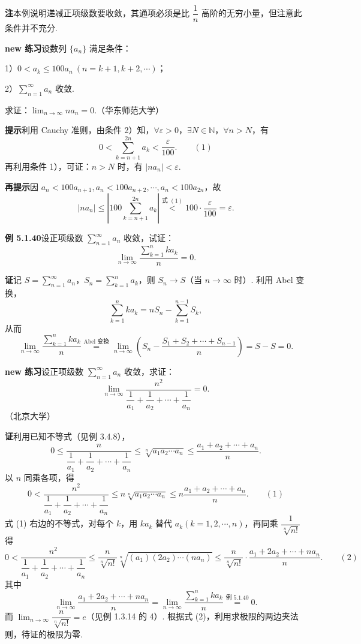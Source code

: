 \documentclass[UTF8,12pt,a4paper,fontset=fandol]{ctexart}
\begin{document}
\noindent\textbf{注}\quad 本例说明递减正项级数要收敛，其通项必须是比 $\dfrac1n$ 高阶的无穷小量，但注意此条件并不充分.

\noindent\textbf{new 练习}\quad 设数列 $\{a_n\}$ 满足条件：

1）$0<a_k\le100a_n\ (n=k+1,k+2,\cdots)$；

2）$\displaystyle\sum_{n=1}^{\infty}a_n$ 收敛.

求证：$\displaystyle\lim_{n\to\infty}na_n=0$.（华东师范大学）

\noindent\textbf{提示}\quad 利用 Cauchy 准则，由条件 2）知，$\forall\varepsilon>0$，$\exists N\in\mathbb N$，$\forall n>N$，有
\[
  0<\sum_{k=n+1}^{2n}a_k<\frac{\varepsilon}{100}.
\qquad(1)
\]
再利用条件 1），可证：$n>N$ 时，有 $|na_n|<\varepsilon$.

\noindent\textbf{再提示}\quad 因 $a_n<100a_{n+1},a_n<100a_{n+2},\cdots,a_n<100a_{2n}$，故
\[
  |na_n|\le\left|100\sum_{k=n+1}^{2n}a_k\right|
  \stackrel{\text{式 }(1)}{<}100\cdot\frac{\varepsilon}{100}=\varepsilon.
\]

\noindent\textbf{例 5.1.40}\quad 设正项级数 $\displaystyle\sum_{n=1}^{\infty}a_n$ 收敛，试证：
\[
  \lim_{n\to\infty}\frac{\sum_{k=1}^n ka_k}{n}=0.
\]

\noindent\textbf{证}\quad 记 $S=\displaystyle\sum_{n=1}^{\infty}a_n$，$S_n=\displaystyle\sum_{k=1}^n a_k$，则 $S_n\to S$（当 $n\to\infty$ 时）. 利用 Abel 变换，
\[
  \sum_{k=1}^n ka_k=nS_n-\sum_{k=1}^{n-1}S_k,
\]
从而
\[
  \lim_{n\to\infty}\frac{\sum_{k=1}^n ka_k}{n}
  \stackrel{\text{Abel 变换}}{=}
  \lim_{n\to\infty}\left(S_n-\frac{S_1+S_2+\cdots+S_{n-1}}n\right)
  =S-S=0.
\]

\noindent\textbf{new 练习}\quad 设正项级数 $\displaystyle\sum_{n=1}^{\infty}a_n$ 收敛，求证：
\[
  \lim_{n\to\infty}\frac{n^2}{\dfrac1{a_1}+\dfrac1{a_2}+\cdots+\dfrac1{a_n}}=0.
\]
（北京大学）

\noindent\textbf{证}\quad 利用已知不等式（见例 3.4.8），
\[
  0\le\frac{n}{\dfrac1{a_1}+\dfrac1{a_2}+\cdots+\dfrac1{a_n}}
  \le\sqrt[n]{a_1a_2\cdots a_n}\le\frac{a_1+a_2+\cdots+a_n}{n}.
\]
以 $n$ 同乘各项，得
\[
  0<\frac{n^2}{\dfrac1{a_1}+\dfrac1{a_2}+\cdots+\dfrac1{a_n}}
  \le n\sqrt[n]{a_1a_2\cdots a_n}
  \le n\frac{a_1+a_2+\cdots+a_n}{n}.
\qquad(1)
\]
式 (1) 右边的不等式，对每个 $k$，用 $ka_k$ 替代 $a_k(k=1,2,\cdots,n)$，再同乘 $\dfrac1{\sqrt[n]{n!}}$ 得
\[
  0<\frac{n^2}{\dfrac1{a_1}+\dfrac1{a_2}+\cdots+\dfrac1{a_n}}
  \le\frac n{\sqrt[n]{n!}}\sqrt[n]{(a_1)(2a_2)\cdots(na_n)}
  \le\frac n{\sqrt[n]{n!}}\cdot\frac{a_1+2a_2+\cdots+na_n}{n}.
\qquad(2)
\]
其中
\[
  \lim_{n\to\infty}\frac{a_1+2a_2+\cdots+na_n}{n}
  =\lim_{n\to\infty}\frac{\sum_{k=1}^nka_k}{n}
  \stackrel{\text{例 5.1.40}}{=}0.
\]
而 $\displaystyle\lim_{n\to\infty}\dfrac n{\sqrt[n]{n!}}=e$（见例 1.3.14 的 4）. 根据式 (2)，利用求极限的两边夹法则，待证的极限为零.
\end{document}

